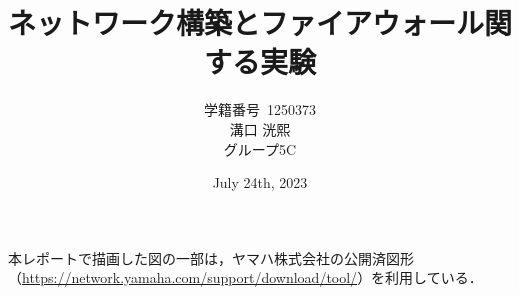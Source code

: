 \documentclass[titlepage]{ltjsarticle}
\title{ネットワーク構築とファイアウォール関する実験}
\author{学籍番号~1250373\\溝口 洸熙\\グループ5C}
\date{July 24th, 2023}
\begin{document}






\begin{framed}
    \noindent 本レポートで描画した図の一部は，ヤマハ株式会社の公開済図形（\url{https://network.yamaha.com/support/download/tool/}）を利用している．
\end{framed}
\end{document}
